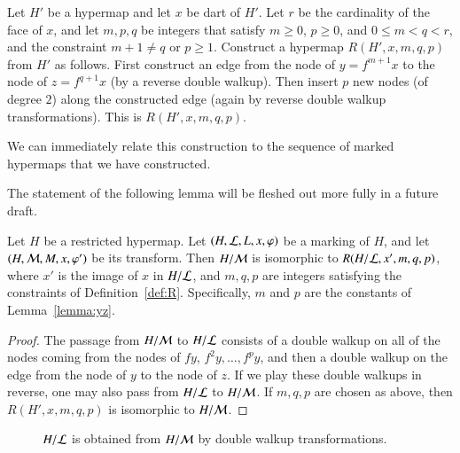\begin{definition}[R]\label{def:R}  
Let $H'$ be a hypermap and let $x$ be dart of $H'$.  Let  $r$ be the
cardinality of the face of $x$,
and let $m,p,q$ be integers that
satisfy $m\ge 0$, $p\ge 0$, and $0 \le m < q < r$,
and the  constraint  $m+1\ne q$ or $p\ge1$.  
Construct a hypermap $R(H',x,m,q,p)$ from $H'$ as follows.
First
construct an edge from the node of $y = f^{m+1} x$ to the node of $z =
f^{q+1} x$ (by a reverse double walkup).  Then insert $p$ new nodes (of
degree $2$) along the constructed edge (again by reverse double walkup transformations).  
This is $R(H',x,m,q,p)$.  
\end{definition}

We can immediately relate this construction to the sequence of marked hypermaps that
we have constructed.

\begin{note} %
The statement of the following lemma will be fleshed out more fully in a future draft.
\end{note}

\begin{lemma} Let $H$ be a restricted hypermap.  Let $(H,{\cal L},L,x,\varphi)$ be
a marking of $H$, and let $(H,{\cal M},M,x,\varphi')$ be its transform.
Then $H/{\cal M}$ is isomorphic to $R(H/{\cal L},x',m,q,p)$, where $x'$ is the image
of $x$ in $H/{\cal L}$, and $m,q,p$ are integers satisfying the constraints of Definition~\ref{def:R}.
Specifically, $m$ and $p$ are the constants of Lemma~\ref{lemma:yz}.  
\end{lemma}

\begin{proof}
The passage from $H/{\cal M}$ to $H/{\cal L}$ consists of a double
walkup on all of the nodes coming from the nodes of $f y$, $f^2 y,
\ldots, f^p y$, and then a double walkup on the edge from the node of
$y$ to the node of
$z$.  %
If we play these double walkups in reverse,
one may also pass from $H/{\cal L}$ to $H/{\cal M}$.  
If
$m,q,p$ are chosen as above, then $R(H',x,m,q,p)$ is isomorphic to
$H/{\cal M}$.  
\end{proof}


\begin{figure}[htb]
\centering
{}
\caption{$H/{\cal L}$ is obtained from $H/{\cal M}$ by double walkup
transformations.}
\label{fig:L1L2dart}
\end{figure}



